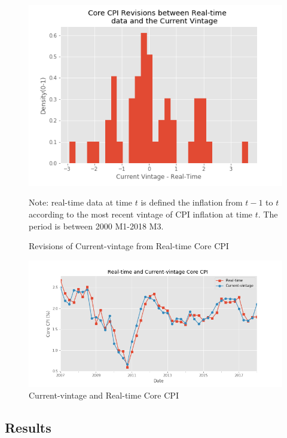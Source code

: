 \documentclass[]{article}
\begin{document}
\begin{figure}[ht]
\includegraphics[width=\textwidth]{figures/hist_rev_realtime.png}
\caption{Revisions of Current-vintage from Real-time Core CPI}
\label{real_time_rev}
	\begin{flushleft}
	{\footnotesize Note: real-time data  at time $t$ is defined the inflation from $t-1$ to $t$ according to the most recent vintage of CPI inflation at time $t$. The period is between 2000 M1-2018 M3.}
\end{flushleft}
\end{figure}


\begin{figure}[ht]
	\includegraphics[width=\textwidth]{figures/ts_rev_realtime.png}
	\caption{Current-vintage and Real-time Core CPI}
	\label{ts_real_time_current_vintage}
\end{figure}

\subsection{Results}
\end{document}

